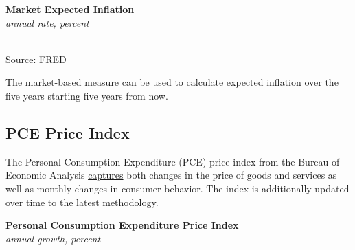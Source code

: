 \documentclass{report}
\makeatletter
\newcommand{\tbllink}[1]{\href{https://raw.githubusercontent.com/bdecon/US-chartbook/master/chartbook/data/#1}{\faTable}}
\newcommand*\short[1]{\expandafter\@gobbletwo\number\numexpr#1\relax}
\newcommand{\absnode}[3]{\node[below right, align=left] at (axis cs: #1,#2) {#3};}
\newcommand{\ltdateaxisticks}{
		date coordinates in=x, axis line style={draw=none},
		xmax={2022-03-15},
		max space between ticks=40,	    
		xtick={{2013-01-01}, {2014-01-01}, {2015-01-01}, {2016-01-01}, {2017-01-01}, {2018-01-01}, 
		    {2019-01-01}, {2020-01-01}, {2021-01-01}, {2022-01-01}},
		enlarge y limits={0.06}, enlarge x limits={0.01},
		}
\newcommand{\bbar}[2]{extra #1 ticks = {{#2}}, extra #1 tick labels = ,
		extra #1 tick style = {grid=major, grid style={thick, black!25}},}
\newcommand{\thinline}[4]{\addplot[no markers, color=#1] 
		table [x=#2, y=#3, col sep=comma] {#4};	}
\newcommand{\rbar}{
		\fill[color=black!10] (axis cs:{2020-02-01},\pgfkeysvalueof{/pgfplots/ymin}) rectangle 
			(axis cs:{2020-05-01}, \pgfkeysvalueof{/pgfplots/ymax});}
\makeatother
\begin{document}
{{\begin{minipage}{0.47\textwidth}
\normalsize \textbf{Market Expected Inflation}\\
\footnotesize{\textit{annual rate, percent}}\\
\hspace*{-2mm} \\
\footnotesize{Source: FRED} \hfill \tbllink{infbreak_comb.csv}
\end{minipage} \hspace{6mm} 
\begin{minipage}{0.24\textwidth}
\small The market-based measure can be used to calculate expected inflation over the five years starting five years from now. 
\end{minipage}
\newpage
\begin{minipage}{0.76\textwidth}
\subsection*{PCE Price Index}
\small The Personal Consumption Expenditure (PCE) price index from the Bureau of Economic Analysis \href{https://www.bea.gov/data/personal-consumption-expenditures-price-index}{captures} both changes in the price of goods and services as well as monthly changes in consumer behavior. The index is additionally updated over time to the latest methodology. 


\vspace{1mm}

\normalsize \textbf{Personal Consumption Expenditure Price Index}\\
\footnotesize{\textit{annual growth, percent}}\\
\vspace{34mm}


\end{minipage}}}
\end{document}
